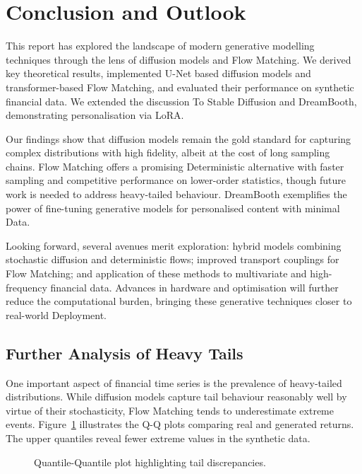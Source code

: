\section{Conclusion and Outlook}

This report has explored the landscape of modern generative modelling
techniques through the lens of diffusion models and Flow Matching.  We
derived key theoretical results, implemented U-Net based diffusion
models and transformer-based Flow Matching, and evaluated their
performance on synthetic financial data.  We extended the discussion
To Stable Diffusion and DreamBooth, demonstrating personalisation via
LoRA.

Our findings show that diffusion models remain the gold standard for
capturing complex distributions with high fidelity, albeit at the cost
of long sampling chains.  Flow Matching offers a promising
Deterministic alternative with faster sampling and competitive
performance on lower-order statistics, though future work is needed to
address heavy-tailed behaviour.  DreamBooth exemplifies the power of
fine-tuning generative models for personalised content with minimal
Data.

Looking forward, several avenues merit exploration: hybrid models
combining stochastic diffusion and deterministic flows; improved
transport couplings for Flow Matching; and application of these
methods to multivariate and high-frequency financial data.  Advances
in hardware and optimisation will further reduce the computational
burden, bringing these generative techniques closer to real-world
Deployment.

\subsection{Further Analysis of Heavy Tails}

One important aspect of financial time series is the prevalence of
heavy-tailed distributions.  While diffusion models capture tail
behaviour reasonably well by virtue of their stochasticity, Flow
Matching tends to underestimate extreme events.  Figure~\ref{fig:qqplot}
illustrates the Q-Q plots comparing real and generated returns.  The
upper quantiles reveal fewer extreme values in the synthetic data.

\begin{figure}[H]
  \centering
  \caption{Quantile-Quantile plot highlighting tail discrepancies.}
  \label{fig:qqplot}
\end{figure}

